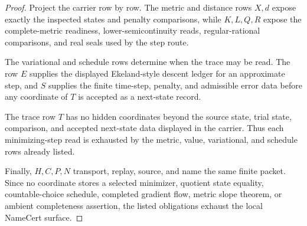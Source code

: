 \begin{proof}
Project the carrier row by row. The metric and distance rows $X,d$ expose exactly the inspected states and penalty comparisons, while $K,L,Q,R$ expose the complete-metric readiness, lower-semicontinuity reads, regular-rational comparisons, and real seals used by the step route.

The variational and schedule rows determine when the trace may be read. The row $E$ supplies the displayed Ekeland-style descent ledger for an approximate step, and $S$ supplies the finite time-step, penalty, and admissible error data before any coordinate of $T$ is accepted as a next-state record.

The trace row $T$ has no hidden coordinates beyond the source state, trial state, comparison, and accepted next-state data displayed in the carrier. Thus each minimizing-step read is exhausted by the metric, value, variational, and schedule rows already listed.

Finally, $H,C,P,N$ transport, replay, source, and name the same finite packet. Since no coordinate stores a selected minimizer, quotient state equality, countable-choice schedule, completed gradient flow, metric slope theorem, or ambient completeness assertion, the listed obligations exhaust the local NameCert surface.
\end{proof}

